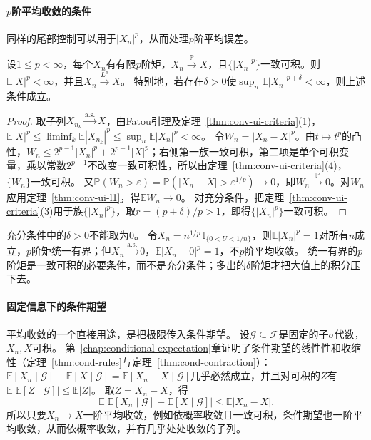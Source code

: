 \paragraph{$p$阶平均收敛的条件}
同样的尾部控制可以用于$|X_n|^p$，从而处理$p$阶平均误差。

\begin{theorem}[$p$阶平均收敛的一致可积条件]
\label{thm:conv-ui-lp}
设$1\leq p<\infty$，每个$X_n$有有限$p$阶矩，$X_n\xrightarrow{\mathbb P}X$，且$\{|X_n|^p\}$一致可积。则$\mathbb E|X|^p<\infty$，并且$X_n\xrightarrow{L^p}X$。
特别地，若存在$\delta>0$使$\sup_n\mathbb E|X_n|^{p+\delta}<\infty$，则上述条件成立。
\end{theorem}

\begin{proof}
取子列$X_{n_k}\xrightarrow{\mathrm{a.s.}}X$，由Fatou引理及定理~\ref{thm:conv-ui-criteria}(1)，$\mathbb E|X|^p\leq\liminf_k\mathbb E|X_{n_k}|^p\leq\sup_n\mathbb E|X_n|^p<\infty$。
令$W_n=|X_n-X|^p$。由$t\mapsto t^p$的凸性，$W_n\leq2^{p-1}|X_n|^p+2^{p-1}|X|^p$；右侧第一族一致可积，第二项是单个可积变量，乘以常数$2^{p-1}$不改变一致可积性，所以由定理~\ref{thm:conv-ui-criteria}(4)，$\{W_n\}$一致可积。
又$\mathbb P(W_n>\varepsilon)=\mathbb P(|X_n-X|>\varepsilon^{1/p})\to0$，即$W_n\xrightarrow{\mathbb P}0$。对$W_n$应用定理~\ref{thm:conv-ui-l1}，得$\mathbb EW_n\to0$。
对充分条件，把定理~\ref{thm:conv-ui-criteria}(3)用于族$\{|X_n|^p\}$，取$r=(p+\delta)/p>1$，即得$\{|X_n|^p\}$一致可积。
\end{proof}

充分条件中的$\delta>0$不能取为$0$。
令$X_n=n^{1/p}\,\mathbb I_{\{0<U<1/n\}}$，则$\mathbb E|X_n|^p=1$对所有$n$成立，$p$阶矩统一有界；但$X_n\xrightarrow{\mathrm{a.s.}}0$，$\mathbb E|X_n-0|^p=1$，不$p$阶平均收敛。
统一有界的$p$阶矩是一致可积的必要条件，而不是充分条件；多出的$\delta$阶矩才把大值上的积分压下去。

\paragraph{固定信息下的条件期望}
平均收敛的一个直接用途，是把极限传入条件期望。
设$\mathcal G\subseteq\mathcal F$是固定的子$\sigma$代数，$X_n,X$可积。
第~\ref{chap:conditional-expectation}章证明了条件期望的线性性和收缩性（定理~\ref{thm:cond-rules}与定理~\ref{thm:cond-contraction}）：$\mathbb E[X_n\mid\mathcal G]-\mathbb E[X\mid\mathcal G]=\mathbb E[X_n-X\mid\mathcal G]$几乎必然成立，并且对可积的$Z$有$\mathbb E\bigl|\mathbb E[Z\mid\mathcal G]\bigr|\leq\mathbb E|Z|$。
取$Z=X_n-X$，得
\[
  \mathbb E\bigl|\mathbb E[X_n\mid\mathcal G]-\mathbb E[X\mid\mathcal G]\bigr|\leq\mathbb E|X_n-X|.
\]
所以只要$X_n\to X$一阶平均收敛，例如依概率收敛且一致可积，条件期望也一阶平均收敛，从而依概率收敛，并有几乎处处收敛的子列。

